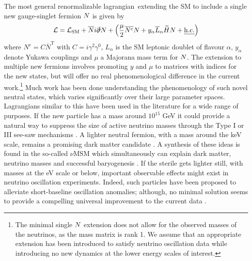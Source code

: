 \documentclass[11pt, a4paper]{article}
\def\lagrangian{lagrangian}
\def\ster{\ensuremath N}
\begin{document}
The most general renormalizable \lagrangian\ extending the SM to include a
single new gauge-singlet fermion $\ster$ is given by
%
\begin{align}   \mathcal{L} = \mathcal{L}_\text{SM} +
\overline{\ster}i\slashed{\partial}\ster + \left(\frac{\mu}{2}
\overline{\ster^\text{c}}\ster  + y_\alpha\overline{L}_\alpha\widetilde{H}
\ster + \text{\emph{h.c.}}\right)\label{eq:minimallag} \end{align}
%
where $N^c=C\overline{N}^\text{T}$ with $C=i\gamma^2\gamma^0$, $L_\alpha$ is
the SM leptonic doublet of flavour $\alpha$, $y_\alpha$ denote Yukawa couplings
and $\mu$ a Majorana mass term for $\ster$. The extension to multiple new
fermions involves promoting $y$ and $\mu$ to matrices with indices for the new
states, but will offer no real phenomenological difference in the current
work.\footnote{The minimal single $\ster$ extension does not allow for the
observed masses of the neutrinos, as the mass matrix is rank 1. We assume that
an appropriate extension has been introduced to satisfy neutrino oscillation
data while introducing no new dynamics at the lower energy scales of interest.}
Much work has been done understanding the phenomenology of such novel neutral
states, which varies significantly over their large parameter spaces. 
%
Lagrangians similar to this have been used in the literature for a wide range
of purposes. If the new particle has a mass around $10^{15}$ GeV it could
provide a natural way to suppress the size of active neutrino masses through
the Type I or III see-saw mechanisms \cite{Minkowski:1977sc, GellMann:1980vs,
Mohapatra:1979ia}. A lighter neutral fermion, with a mass around the keV scale,
remains a promising dark matter candidate \cite{Adhikari:2016bei}. A synthesis
of these ideas is found in the so-called $\nu$MSM which simultaneously can
explain dark matter, neutrino masses and successful baryogenesis
\cite{Asaka:2005pn}. 
%
If the sterile gets lighter still, with masses at the eV scale or below,
important observable effects might exist in neutrino oscillation experiments.
Indeed, such particles have been proposed to alleviate short-baseline
oscillation anomalies; although, no minimal solution seems to provide a
compelling universal improvement to the current data
\cite{Kopp:2013vaa,Conrad:2012qt}.
\end{document}
